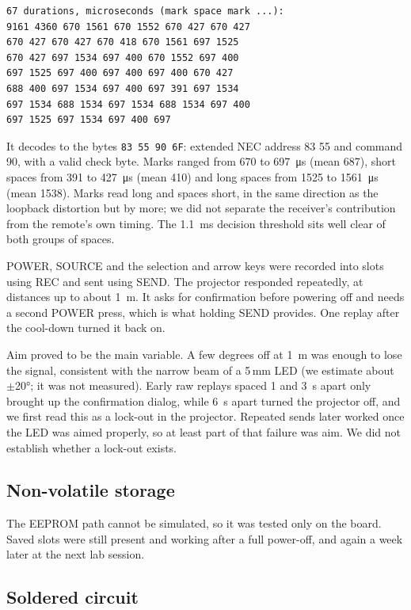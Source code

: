 \documentclass[11pt,a4paper]{article}
\newcommand{\code}[1]{\texttt{#1}}
\begin{document}
\begin{lstlisting}[style=dump]
67 durations, microseconds (mark space mark ...):
9161 4360 670 1561 670 1552 670 427 670 427
670 427 670 427 670 418 670 1561 697 1525
670 427 697 1534 697 400 670 1552 697 400
697 1525 697 400 697 400 697 400 670 427
688 400 697 1534 697 400 697 391 697 1534
697 1534 688 1534 697 1534 688 1534 697 400
697 1525 697 1534 697 400 697
\end{lstlisting}

It decodes to the bytes \code{83 55 90 6F}: extended NEC address 83 55 and command 90, with a valid check byte. Marks ranged from 670 to \qty{697}{\micro\second} (mean 687), short spaces from 391 to \qty{427}{\micro\second} (mean 410) and long spaces from 1525 to \qty{1561}{\micro\second} (mean 1538). Marks read long and spaces short, in the same direction as the loopback distortion but by more; we did not separate the receiver's contribution from the remote's own timing. The \qty{1.1}{\milli\second} decision threshold sits well clear of both groups of spaces.

POWER, SOURCE and the selection and arrow keys were recorded into slots using REC and sent using SEND. The projector responded repeatedly, at distances up to about \qty{1}{\metre}. It asks for confirmation before powering off and needs a second POWER press, which is what holding SEND provides. One replay after the cool-down turned it back on.

Aim proved to be the main variable. A few degrees off at \qty{1}{\metre} was enough to lose the signal, consistent with the narrow beam of a 5\,mm LED (we estimate about $\pm$\ang{20}; it was not measured). Early raw replays spaced 1 and \qty{3}{\second} apart only brought up the confirmation dialog, while \qty{6}{\second} apart turned the projector off, and we first read this as a lock-out in the projector. Repeated sends later worked once the LED was aimed properly, so at least part of that failure was aim. We did not establish whether a lock-out exists.

\subsection{Non-volatile storage}

The EEPROM path cannot be simulated, so it was tested only on the board. Saved slots were still present and working after a full power-off, and again a week later at the next lab session.

\subsection{Soldered circuit}
\end{document}
